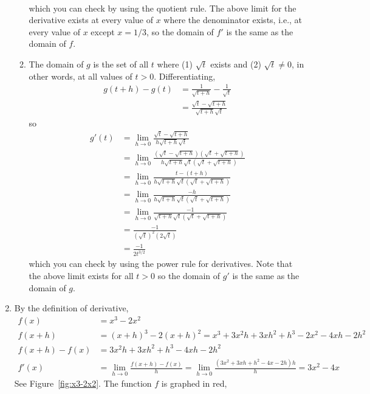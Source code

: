 \documentclass{article}
\begin{document}
\begin{enumerate}
\begin{enumerate}
\begin{align*}
    \end{align*}
    which you can check by using the quotient rule.  The above limit for 
    the derivative exists at every value of $x$ where the denominator
    exists, i.e., at every value of $x$ except $x=1/3$, so the domain of
    $f'$ is the same as the domain of $f$.
  \item %
    The domain of $g$ is the set of all $t$ where (1) $\sqrt{t}$
    exists and (2) $\sqrt{t}\ne 0$, in other words, at all values of
    $t>0$.  Differentiating,
    \begin{align*}
      g(t+h) - g(t) &= \frac{1}{\sqrt{t+h}} - \frac{1}{\sqrt{t}}
      \\
      &= \frac{\sqrt{t}-\sqrt{t+h}}{\sqrt{t+h}\sqrt{t}}
    \end{align*}
    so
    \begin{align*}
      g'(t) &= \lim_{h\to 0} \frac{\sqrt{t}-\sqrt{t+h}}{h\sqrt{t+h}\sqrt{t}}
      \\
      &= \lim_{h\to 0} \frac{(\sqrt{t}-\sqrt{t+h})(\sqrt{t}+\sqrt{t+h})}{
        h\sqrt{t+h}\sqrt{t}(\sqrt{t}+\sqrt{t+h})}
      \\
      &= \lim_{h\to 0} \frac{t-(t+h)}{
        h\sqrt{t+h}\sqrt{t}(\sqrt{t}+\sqrt{t+h})}
      \\
      &= \lim_{h\to 0} \frac{-h}{
        h\sqrt{t+h}\sqrt{t}(\sqrt{t}+\sqrt{t+h})}
      \\
      &= \lim_{h\to 0} \frac{-1}{
        \sqrt{t+h}\sqrt{t}(\sqrt{t}+\sqrt{t+h})}
      \\
      &= \frac{-1}{(\sqrt{t})^2(2\sqrt{t})}
      \\
      &= \frac{-1}{2t^{3/2}}
    \end{align*}
    which you can check by using the power rule for derivatives.
    Note that the above limit exists for all $t>0$ so the domain of $g'$
    is the same as the domain of $g$.
  \end{enumerate}
\item By the definition of derivative,
  \begin{align*}
    f(x) &= x^3 - 2x^2 \\
    f(x+h) &= (x+h)^3 - 2(x+h)^2 = x^3 + 3x^2h + 3xh^2 + h^3 - 2x^2 -4xh -2h^2 \\
    f(x+h)-f(x) &= 3x^2h + 3xh^2 + h^3 -4xh - 2h^2 \\
    f'(x) &= \lim_{h\to 0} \frac{f(x+h)-f(x)}{h}
    = \lim_{h\to 0} \frac{(3x^2+3xh+h^2-4x-2h)h}{h}
    = 3x^2 - 4x
  \end{align*}
  See Figure~\ref{fig:x3-2x2}.  The function \(f\) is graphed in red,

\end{enumerate}
\end{document}
